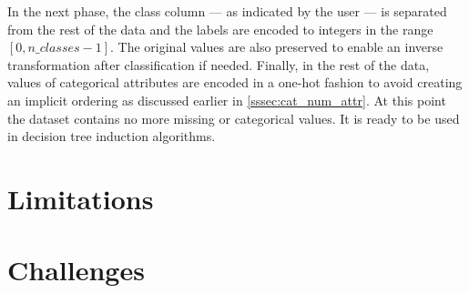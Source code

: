 In the next phase, the class column --- as indicated by the user --- is separated from the rest of the data and the labels are encoded to integers in the range $[0, n\_classes - 1]$. The original values are also preserved to enable an inverse transformation after classification if needed. Finally, in the rest of the data, values of categorical attributes are encoded in a one-hot fashion to avoid creating an implicit ordering as discussed earlier in \autoref{sssec:cat_num_attr}. At this point the dataset contains no more missing or categorical values. It is ready to be used in decision tree induction algorithms.

\section{Limitations}

\section{Challenges}
